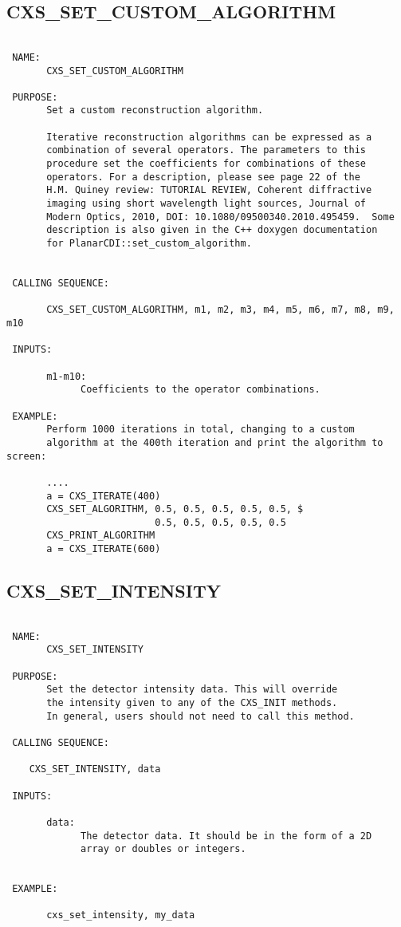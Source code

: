 \subsection{CXS\_SET\_CUSTOM\_ALGORITHM}
\begin{verbatim}

 NAME:
       CXS_SET_CUSTOM_ALGORITHM

 PURPOSE:
       Set a custom reconstruction algorithm.
       
       Iterative reconstruction algorithms can be expressed as a
       combination of several operators. The parameters to this
       procedure set the coefficients for combinations of these
       operators. For a description, please see page 22 of the
       H.M. Quiney review: TUTORIAL REVIEW, Coherent diffractive
       imaging using short wavelength light sources, Journal of
       Modern Optics, 2010, DOI: 10.1080/09500340.2010.495459.  Some
       description is also given in the C++ doxygen documentation
       for PlanarCDI::set_custom_algorithm.


 CALLING SEQUENCE:

       CXS_SET_CUSTOM_ALGORITHM, m1, m2, m3, m4, m5, m6, m7, m8, m9, m10

 INPUTS:

       m1-m10:
             Coefficients to the operator combinations.

 EXAMPLE:
       Perform 1000 iterations in total, changing to a custom
       algorithm at the 400th iteration and print the algorithm to screen:

       ....
       a = CXS_ITERATE(400)
       CXS_SET_ALGORITHM, 0.5, 0.5, 0.5, 0.5, 0.5, $ 
                          0.5, 0.5, 0.5, 0.5, 0.5
       CXS_PRINT_ALGORITHM                    
       a = CXS_ITERATE(600)

\end{verbatim}






  
 
\subsection{CXS\_SET\_INTENSITY}
\begin{verbatim}

 NAME:
       CXS_SET_INTENSITY

 PURPOSE:
       Set the detector intensity data. This will override 
       the intensity given to any of the CXS_INIT methods.
       In general, users should not need to call this method.

 CALLING SEQUENCE:

	CXS_SET_INTENSITY, data

 INPUTS:

       data: 
             The detector data. It should be in the form of a 2D
             array or doubles or integers.


 EXAMPLE:

       cxs_set_intensity, my_data


\end{verbatim}






